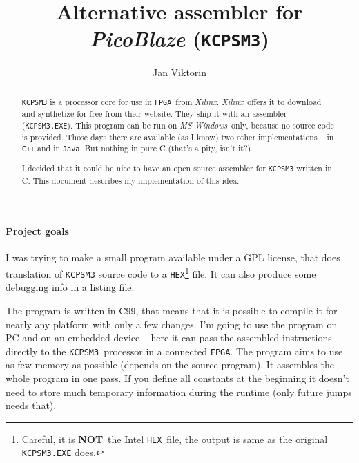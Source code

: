 \documentclass[10pt,a4paper]{article}
\def\KCPSM#1{\texttt{KCPSM#1}}
\def\FPGA{\texttt{FPGA}}
\def\Xilinx{\textit{Xilinx}}
\def\WIN{\textit{MS Windows}}
\def\NOT{\textbf{NOT}}
\def\HEX{\texttt{HEX}}
\begin{document}
\author{Jan Viktorin}
\title{Alternative assembler for \textit{PicoBlaze} (\KCPSM3)}
\maketitle

\begin{abstract}
\KCPSM3 is a processor core for use in \FPGA\ from \Xilinx. \Xilinx\ offers it to download and
	synthetize for free from their website. They ship it with an assembler (\texttt{KCPSM3.EXE}).
	This program can be run on \WIN\ only, because no source code is provided. Those days there are
	available (as I know) two other implementations -- in \texttt{C++} and in \texttt{Java}. 
	But nothing in pure C (that's a pity, isn't it?).

	I decided that it could be nice to have an open source assembler for \KCPSM3 written in C.
	This document describes my implementation of this idea.
\end{abstract}

\paragraph{Project goals}
I was trying to make a small program available under a GPL license, that does translation of \KCPSM3 source code
	to a \HEX\footnote{Careful, it is \NOT\ the Intel \HEX\ file, the output is same as the original \texttt{KCPSM3.EXE}
	does.} file. It can also produce some debugging info in a listing file. 

The program is written in C99, that means that it is possible to compile it for nearly any platform with
	only a few changes. I'm going to use the program on PC and on an embedded device -- here it can pass the assembled 
	instructions directly to the \KCPSM3\ processor in a connected \FPGA. The program aims to use as few memory as possible
	(depends	on the source program). It assembles the whole program in one pass. If you define all constants at the beginning
	it doesn't need to store much temporary information during the runtime (only future jumps needs that).
\end{document}
